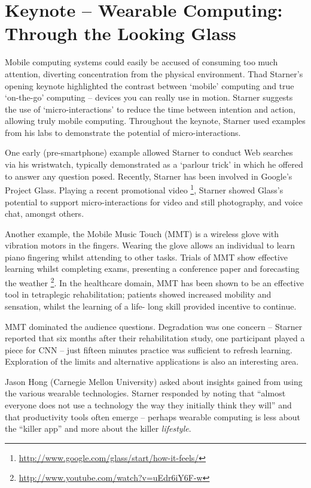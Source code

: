 \section{Keynote -- Wearable Computing: Through the Looking Glass}
\label{sec:keynote}
Mobile computing systems could easily be accused of consuming too much
attention, diverting concentration from the physical environment. Thad
Starner's opening keynote highlighted the contrast between `mobile'
computing and true `on-the-go' computing -- devices you can really use in
motion. Starner suggests the use of `micro-interactions' to reduce the time 
between intention and action, allowing truly mobile computing. Throughout the 
keynote, Starner used examples from his labs to demonstrate the potential of 
micro-interactions.


One early (pre-smartphone) example allowed Starner to conduct Web searches 
via his wristwatch, typically demonstrated as a `parlour trick' in which 
he offered to answer any question posed. Recently, Starner has been involved in 
Google's Project Glass. Playing a recent promotional video 
\footnote{\url{http://www.google.com/glass/start/how-it-feels/}}, Starner showed 
Glass's potential to support micro-interactions for video and still 
photography, and voice chat, amongst others.

Another example, the Mobile Music Touch (MMT) is a wireless glove
with vibration motors in the fingers. Wearing the glove allows an individual to
learn piano fingering whilst attending to other tasks.
Trials of MMT show effective learning whilst completing exams, presenting a
conference paper and forecasting the weather
\footnote{\url{http://www.youtube.com/watch?v=uEdr6iY6F-w}}.
In the healthcare domain,
MMT has been shown to be an effective tool in tetraplegic rehabilitation; 
patients showed increased mobility and sensation, whilst the learning of a life-
long skill provided incentive to continue.

MMT dominated the audience questions. Degradation was one concern -- Starner 
reported that six months after their rehabilitation study, one participant played 
a piece for CNN -- just fifteen minutes practice was sufficient to refresh 
learning. Exploration of the limits and alternative applications is also an 
interesting area.

Jason Hong (Carnegie Mellon University) asked about insights gained from using
the various wearable technologies. Starner responded by noting that 
``almost everyone does not use a technology the way they initially 
think they will'' and that productivity tools often emerge -- perhaps wearable 
computing is less about the ``killer app'' and more about the killer 
\emph{lifestyle}.
